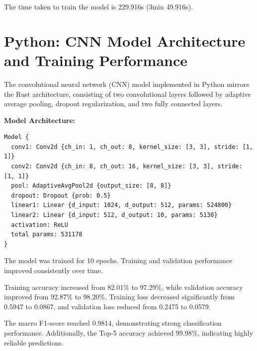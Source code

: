 \documentclass[11pt,a4paper]{article}
\begin{document}
The time taken to train the model is 229.916s (3min 49.916s).



\section{Python: CNN Model Architecture and Training Performance}

The convolutional neural network (CNN) model implemented in Python mirrors the Rust architecture, consisting of two convolutional layers followed by adaptive average pooling, dropout regularization, and two fully connected layers.

\textbf{Model Architecture:}

\begin{verbatim}
Model {
  conv1: Conv2d {ch_in: 1, ch_out: 8, kernel_size: [3, 3], stride: [1, 1]}
  conv2: Conv2d {ch_in: 8, ch_out: 16, kernel_size: [3, 3], stride: [1, 1]}
  pool: AdaptiveAvgPool2d {output_size: [8, 8]}
  dropout: Dropout {prob: 0.5}
  linear1: Linear {d_input: 1024, d_output: 512, params: 524800}
  linear2: Linear {d_input: 512, d_output: 10, params: 5130}
  activation: ReLU
  total params: 531178
}
\end{verbatim}

The model was trained for 10 epochs. Training and validation performance improved consistently over time.

Training accuracy increased from 82.01\% to 97.29\%, while validation accuracy improved from 92.87\% to 98.20\%. 
Training loss decreased significantly from 0.5947 to 0.0867, and validation loss reduced from 0.2475 to 0.0579.

The macro F1-score reached 0.9814, demonstrating strong classification performance. Additionally, the Top-5 accuracy achieved 99.98\%, indicating highly reliable predictions.
\end{document}
